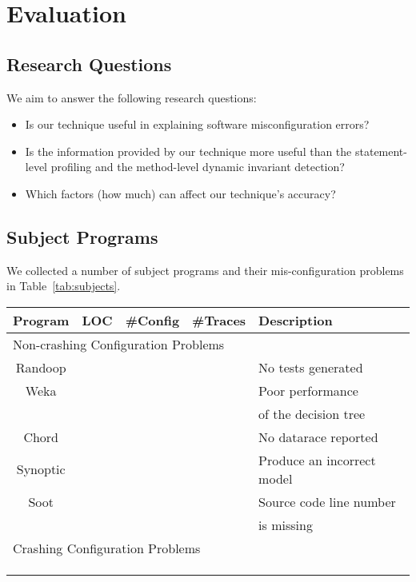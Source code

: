 \section{Evaluation}

\subsection{Research Questions}

We aim to answer the following research questions:

\begin{itemize}
\item Is our technique useful in explaining software misconfiguration errors?
\item Is the information provided by our technique more useful than the statement-level
profiling and the method-level dynamic invariant detection?
\item Which factors (how much) can affect our technique's accuracy?
\end{itemize}

\subsection{Subject Programs}

We collected a number of subject programs and their mis-configuration problems in
Table~\ref{tab:subjects}.

\begin{table}[t]
\setlength{\tabcolsep}{.14\tabcolsep}
\begin{tabular}{|c|c|c|c|l|}
\hline
 Program & LOC & \#Config & \#Traces & Description \\
 \hline
\hline
\multicolumn{5}{|l|}{Non-crashing Configuration Problems}   \\
 \hline
 Randoop & & &&  No tests generated \\
\hline
 Weka &  & && Poor performance \\
 &  & && of the decision tree \\
\hline
 Chord & & && No datarace reported \\
\hline
 Synoptic & && & Produce an incorrect model \\
\hline
 Soot &  &  && Source code line number \\
 &  &  && is missing \\
\hline
\hline
\multicolumn{5}{|l|}{Crashing Configuration Problems}   \\
\hline
& & & &\\
\hline
& & & &\\
\hline
& & & &\\
\hline
\end{tabular}

\end{table}

